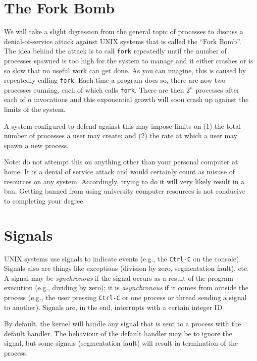 \documentclass[a4paper]{report}
\begin{document}
\section*{The Fork Bomb}

We will take a slight digression from the general topic of processes to discuss a denial-of-service attack against UNIX systems that is called the ``Fork Bomb''. The idea behind the attack is to call \texttt{fork} repeatedly until the number of processes spawned is too high for the system to manage and it either crashes or is so slow that no useful work can get done. As you can imagine, this is caused by repeatedly calling \texttt{fork}. Each time a program does so, there are now two processes running, each of which calls \texttt{fork}. There are then $2^{n}$ processes after each of $n$ invocations and this exponential growth will soon crash up against the limits of the system.

A system configured to defend against this may impose limits on (1) the total number of processes a user may create; and (2) the rate at which a user may spawn a new process.

Note: do not attempt this on anything other than your personal computer at home. It is a denial of service attack and would certainly count as misuse of resources on any system. Accordingly, trying to do it will very likely result in a ban. Getting banned from using university computer resources is not conducive to completing your degree.


\section*{Signals}

UNIX systems use signals to indicate events (e.g., the \texttt{Ctrl-C} on the console). Signals also are things like exceptions (division by zero, segmentation fault), etc. A signal may be \textit{synchronous} if the signal occurs as a result of the program execution (e.g., dividing by zero); it is \textit{asynchronous} if it comes from outside the process (e.g., the user pressing \texttt{Ctrl-C} or one process or thread sending a signal to another). Signals are, in the end, interrupts with a certain integer ID.

By default, the kernel will handle any signal that is sent to a process with the default handler. The behaviour of the default handler may be to ignore the signal, but some signals (segmentation fault) will result in termination of the process.
\end{document}

